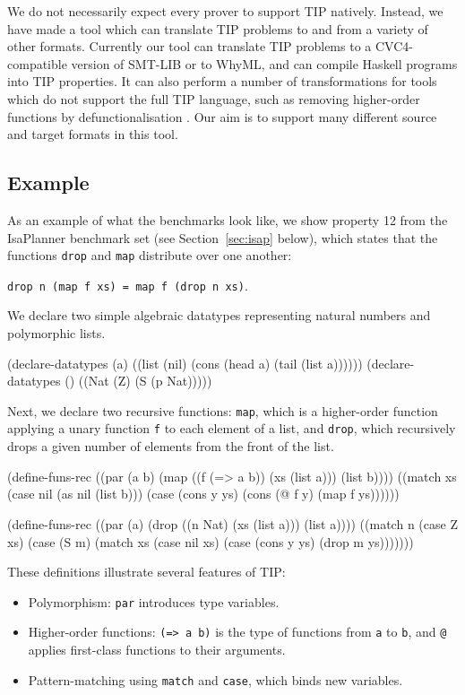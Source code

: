 \documentclass{llncs}
\begin{document}
We do not necessarily expect every prover to support TIP 
natively. Instead, we have made a tool which can translate 
TIP problems to and from a variety of other formats. Currently 
our tool can translate TIP problems to a CVC4-compatible version 
of SMT-LIB or to WhyML, and can compile Haskell programs into 
TIP properties. It can also perform a number of transformations 
for tools which do not support the full TIP language, such as 
removing higher-order functions by defunctionalisation 
\cite{defunc}. Our aim is to support many different source and
target formats in this tool.

\subsection*{Example}
As an example of what the benchmarks look like, we show 
property 12 from the IsaPlanner benchmark set (see 
Section~\ref{sec:isap} below), which states that the functions 
\texttt{drop} and \texttt{map} distribute over one another: 
\begin{center}
\texttt{drop n (map f xs) = map f (drop n xs)}.
\end{center}
We declare two simple algebraic datatypes representing natural 
numbers and polymorphic lists.

\begin{code}
(declare-datatypes (a)
  ((list (nil) (cons (head a) (tail (list a))))))
(declare-datatypes () ((Nat (Z) (S (p Nat)))))
\end{code}
Next, we declare two recursive functions: \texttt{map}, which is a higher-order
function applying a unary function \texttt{f} to each element of a
list, and \texttt{drop}, which recursively drops a given number of elements
from the front of the list.

\begin{code}
(define-funs-rec
  ((par (a b) (map ((f (=> a b)) (xs (list a))) (list b))))
  ((match xs
     (case nil (as nil (list b)))
     (case (cons y ys) (cons (@ f y) (map f ys))))))
\end{code}
\begin{code}
(define-funs-rec
  ((par (a) (drop ((n Nat) (xs (list a))) (list a))))
  ((match n
     (case Z xs)
     (case (S m)
       (match xs
         (case nil xs)
         (case (cons y ys) (drop m ys)))))))
\end{code}

These definitions illustrate several features of TIP:
\begin{itemize}
  \item Polymorphism: \verb|par| introduces type variables.
  \item Higher-order functions: \verb|(=> a b)| is the type of
    functions from \verb|a| to \verb|b|, and \verb|@| applies
    first-class functions to their arguments.
  \item Pattern-matching using \verb|match| and \verb|case|, which binds new variables.
\end{itemize}
\end{document}
